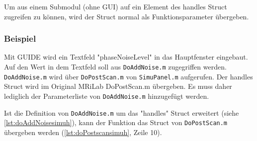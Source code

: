 Um aus einem Submodul (ohne GUI) auf ein Element des handles Struct zugreifen zu können, wird der Struct normal als Funktionsparameter übergeben.

\subsubsection{Beispiel}
Mit GUIDE wird ein Textfeld "phaseNoiseLevel" in das Hauptfenster eingebaut.
Auf den Wert in dem Textfeld soll aus \texttt{DoAddNoise.m} zugegriffen werden. \texttt{DoAddNoise.m} wird über \texttt{DoPostScan.m} von \texttt{SimuPanel.m} aufgerufen. Der handles Struct wird im Original MRiLab DoPostScan.m übergeben. Es muss daher lediglich der Parameterliste von \texttt{DoAddNoise.m} hinzugefügt werden.


Ist die Definition von \texttt{DoAddNoise.m} um das "handles" Struct erweitert (siehe \autoref{lst:doAddNoisesimuh}), kann der Funktion das Struct von \texttt{DoPostScan.m} übergeben werden (\autoref{lst:doPostscansimuh}, Zeile 10).


